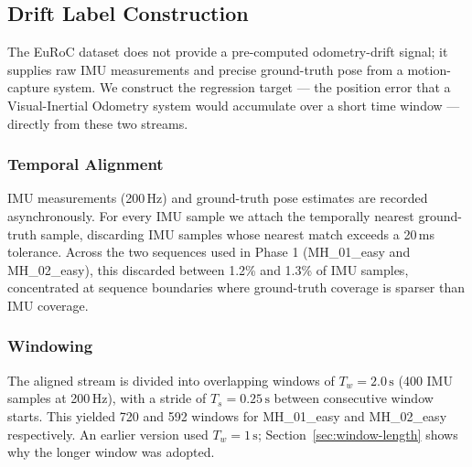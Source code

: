 %

\subsection{Drift Label Construction}
\label{sec:label-construction}

The EuRoC dataset does not provide a pre-computed odometry-drift signal;
it supplies raw IMU measurements and precise ground-truth pose from a
motion-capture system. We construct the regression target — the position
error that a Visual-Inertial Odometry system would accumulate over a
short time window — directly from these two streams.

\subsubsection{Temporal Alignment}
IMU measurements (200\,Hz) and ground-truth pose estimates are recorded
asynchronously. For every IMU sample we attach the temporally nearest
ground-truth sample, discarding IMU samples whose nearest match exceeds
a 20\,ms tolerance. Across the two sequences used in Phase 1
(MH\_01\_easy and MH\_02\_easy), this discarded between
1.2\% and 1.3\% of IMU samples, concentrated at sequence boundaries
where ground-truth coverage is sparser than IMU coverage.

\subsubsection{Windowing}
The aligned stream is divided into overlapping windows of
$T_w = 2.0\,\mathrm{s}$ (400 IMU samples at 200\,Hz), with a stride of
$T_s = 0.25\,\mathrm{s}$ between consecutive window starts. This yielded
720 and 592 windows for MH\_01\_easy and MH\_02\_easy respectively.
An earlier version used $T_w = 1\,\mathrm{s}$;
Section~\ref{sec:window-length} shows why the longer window was adopted.

